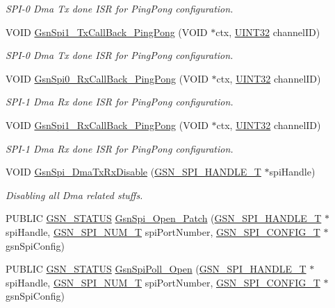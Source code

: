 \begin{DoxyCompactItemize}
\begin{DoxyCompactList}\small\item\em SPI-\/0 Dma Tx done ISR for PingPong configuration. \end{DoxyCompactList}\item 
VOID \hyperlink{a00655_ga5aad26534270bea0b8fa13834ef568e2}{GsnSpi1\_\-TxCallBack\_\-PingPong} (VOID $\ast$ctx, \hyperlink{a00660_gae1e6edbbc26d6fbc71a90190d0266018}{UINT32} channelID)
\begin{DoxyCompactList}\small\item\em SPI-\/0 Dma Tx done ISR for PingPong configuration. \end{DoxyCompactList}\item 
VOID \hyperlink{a00655_gab4482aa8532a1a9b1f886148f19d5ecf}{GsnSpi0\_\-RxCallBack\_\-PingPong} (VOID $\ast$ctx, \hyperlink{a00660_gae1e6edbbc26d6fbc71a90190d0266018}{UINT32} channelID)
\begin{DoxyCompactList}\small\item\em SPI-\/1 Dma Rx done ISR for PingPong configuration. \end{DoxyCompactList}\item 
VOID \hyperlink{a00655_gad380e1dfec5929d457d5e64153229d14}{GsnSpi1\_\-RxCallBack\_\-PingPong} (VOID $\ast$ctx, \hyperlink{a00660_gae1e6edbbc26d6fbc71a90190d0266018}{UINT32} channelID)
\begin{DoxyCompactList}\small\item\em SPI-\/1 Dma Rx done ISR for PingPong configuration. \end{DoxyCompactList}\item 
VOID \hyperlink{a00655_ga66aa235e1a4eef449cdcf4e4e0d51730}{GsnSpi\_\-DmaTxRxDisable} (\hyperlink{a00238}{GSN\_\-SPI\_\-HANDLE\_\-T} $\ast$spiHandle)
\begin{DoxyCompactList}\small\item\em Disabling all Dma related stuffs. \end{DoxyCompactList}\item 
PUBLIC \hyperlink{a00660_gada5951904ac6110b1fa95e51a9ddc217}{GSN\_\-STATUS} \hyperlink{a00655_ga96438fab641da9e6b7d5ac42efb0a06a}{GsnSpi\_\-Open\_\-Patch} (\hyperlink{a00238}{GSN\_\-SPI\_\-HANDLE\_\-T} $\ast$spiHandle, \hyperlink{a00587_a8158d263babcdfe1b3b113e23acd1bf7}{GSN\_\-SPI\_\-NUM\_\-T} spiPortNumber, \hyperlink{a00231}{GSN\_\-SPI\_\-CONFIG\_\-T} $\ast$gsnSpiConfig)
\item 
PUBLIC \hyperlink{a00660_gada5951904ac6110b1fa95e51a9ddc217}{GSN\_\-STATUS} \hyperlink{a00655_gab8f70d3f443325f36ae63f19133e3adf}{GsnSpiPoll\_\-Open} (\hyperlink{a00238}{GSN\_\-SPI\_\-HANDLE\_\-T} $\ast$spiHandle, \hyperlink{a00587_a8158d263babcdfe1b3b113e23acd1bf7}{GSN\_\-SPI\_\-NUM\_\-T} spiPortNumber, \hyperlink{a00231}{GSN\_\-SPI\_\-CONFIG\_\-T} $\ast$gsnSpiConfig)

\end{DoxyCompactItemize}
